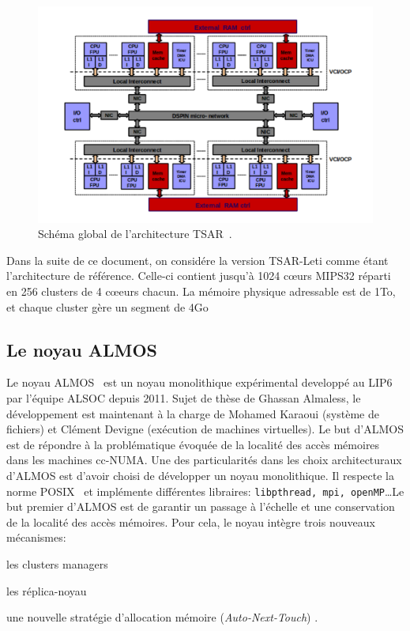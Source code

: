       \begin{figure}[ht]
        \centering \includegraphics[scale=0.2]{include/img/tsar.png}
        \caption{Schéma global de l'architecture TSAR~\citep{greiner2009tsar}.}
        \label{fig:tsar}
      \end{figure}

      Dans la suite de ce document, on considére la version TSAR-Leti comme
      étant l'architecture de référence. Celle-ci contient jusqu'à 1024 c\oe urs
      MIPS32 réparti en 256 clusters de 4 c\oe eurs chacun. La mémoire physique
      adressable est de 1To, et chaque cluster gère un segment de 4Go


    \subsection{Le noyau ALMOS}
    \label{sec:almos}

      Le noyau ALMOS~\cite{almaless2011almos,almaless2014universite} est un
      noyau monolithique expérimental developpé au LIP6 par l'équipe ALSOC
      depuis 2011. Sujet de thèse de Ghassan Almaless, le développement est
      maintenant à la charge de Mohamed Karaoui (système de fichiers) et Clément
      Devigne (exécution de machines virtuelles). Le but d'ALMOS est de répondre
      à la problématique évoquée de la localité des accès mémoires dans les
      machines cc-NUMA. Une des particularités dans les choix architecturaux
      d'ALMOS est d'avoir choisi de développer un noyau monolithique. Il
      respecte la norme POSIX~\cite{posix2013} et implémente différentes
      libraires: \texttt{libpthread, mpi, openMP}\ldots Le but premier d'ALMOS
      est de garantir un passage à l'échelle et une conservation de la localité
      des accès mémoires. Pour cela, le noyau intègre trois nouveaux mécanismes:
      \benumline \item les clusters managers \item les réplica-noyau \item une
      nouvelle stratégie d'allocation mémoire (\textit{Auto-Next-Touch})
      \eenumline.


